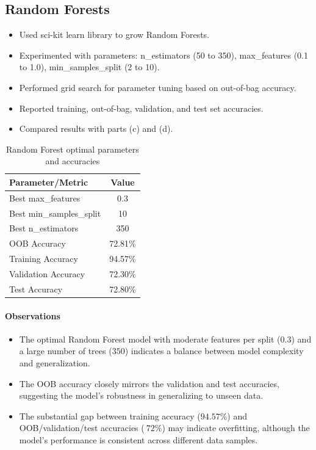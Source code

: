 \documentclass[12pt]{article}
\begin{document}
\subsection{Random Forests}
    \begin{itemize}
        \item Used sci-kit learn library to grow Random Forests.
        \item Experimented with parameters: n\_estimators (50 to 350), max\_features (0.1 to 1.0), min\_samples\_split (2 to 10).
        \item Performed grid search for parameter tuning based on out-of-bag accuracy.
        \item Reported training, out-of-bag, validation, and test set accuracies.
        \item Compared results with parts (c) and (d).
    \end{itemize}

\begin{table}[h!]
\centering
\begin{tabular}{|l|c|}
\hline
\textbf{Parameter/Metric} & \textbf{Value} \\
\hline
Best max\_features & 0.3 \\
Best min\_samples\_split & 10 \\
Best n\_estimators & 350 \\
OOB Accuracy & 72.81\% \\
Training Accuracy & 94.57\% \\
Validation Accuracy & 72.30\% \\
Test Accuracy & 72.80\% \\
\hline
\end{tabular}
\caption{Random Forest optimal parameters and accuracies}
\label{tab:rf_results}
\end{table}

\paragraph{Observations}
\begin{itemize}
  \item The optimal Random Forest model with moderate features per split (\(0.3\)) and a large number of trees (\(350\)) indicates a balance between model complexity and generalization.
  \item The OOB accuracy closely mirrors the validation and test accuracies, suggesting the model's robustness in generalizing to unseen data.
  \item The substantial gap between training accuracy (\(94.57\%\)) and OOB/validation/test accuracies (\(~72\%\)) may indicate overfitting, although the model's performance is consistent across different data samples.
\end{itemize}
\end{document}

